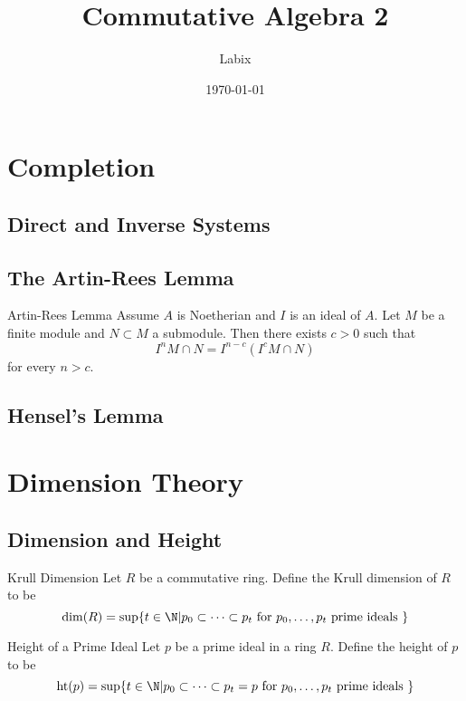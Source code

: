 \documentclass[a4paper]{article}
\title{Commutative Algebra 2}
\author{Labix}
\date{\today}
\begin{document}
\maketitle
\begin{abstract}
\end{abstract}
\pagebreak
\tableofcontents
\pagebreak

\pagebreak

\section{Completion}
\subsection{Direct and Inverse Systems}
\subsection{The Artin-Rees Lemma}
\begin{thm}{Artin-Rees Lemma}{} Assume $A$ is Noetherian and $I$ is an ideal of $A$. Let $M$ be a finite module and $N\subset M$ a submodule. Then there exists $c>0$ such that $$I^nM\cap N=I^{n-c}(I^cM\cap N)$$ for every $n>c$. 
\end{thm}

\subsection{Hensel's Lemma}

\pagebreak
\section{Dimension Theory}
\subsection{Dimension and Height}
\begin{defn}{Krull Dimension}{} Let $R$ be a commutative ring. Define the Krull dimension of $R$ to be $$\dim(R)=\sup\{t\in\N|p_0\subset\dots\subset p_t\text{ for }p_0,\dots,p_t\text{ prime ideals }\}$$
\end{defn}

\begin{defn}{Height of a Prime Ideal}{} Let $p$ be a prime ideal in a ring $R$. Define the height of $p$ to be $$\text{ht}(p)=\sup\{t\in\N|p_0\subset\dots\subset p_t=p\text{ for }p_0,\dots,p_t\text{ prime ideals }\}$$
\end{defn}
\end{document}
